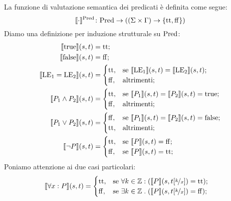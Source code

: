 \begin{definizione} 
La funzione di valutazione semantica dei predicati è definita come segue:
\[
   \mathord{\llbracket \cdot \rrbracket ^{\mathrm{Pred}}}\colon\mathrm{Pred}\to((\Sigma \times \Gamma) \rightarrow \{\mathrm{tt},\mathrm{ff}\})
\]
Diamo una definizione per induzione strutturale su $\mathrm{Pred}$:
\begin{align*}
   \llbracket \mathrm{true} \rrbracket(s,t)
      &= \mathrm{tt};\\
   \llbracket \mathrm{false} \rrbracket(s,t)
      &= \mathrm{ff};\\
   \llbracket \mathrm{LE}_1 = \mathrm{LE}_2\rrbracket(s,t)
      &=
        \begin{cases}
                \mathrm{tt}, &\text{se $\llbracket\mathrm{LE}_1\rrbracket(s,t) = \llbracket \mathrm{LE}_2 \rrbracket(s,t)$};\\
                \mathrm{ff}, &\text{altrimenti};
        \end{cases}\\
    \llbracket P_1 \land P_2\rrbracket(s,t)
      &=
        \begin{cases}
                \mathrm{tt}, &\text{se $\llbracket P_1\rrbracket(s,t) = \llbracket P_2\rrbracket(s,t) = \mathrm{true}$};\\
                \mathrm{ff}, &\text{altrimenti};
        \end{cases}\\
    \llbracket P_1 \lor P_2\rrbracket(s,t)
      &=
        \begin{cases}
                \mathrm{ff}, &\text{se $\llbracket P_1\rrbracket(s,t) = \llbracket P_2\rrbracket(s,t) = \mathrm{false}$};\\
                \mathrm{tt}, &\text{altrimenti};
        \end{cases} \\
    \llbracket \neg P\rrbracket(s,t)
       &=
        \begin{cases}
                \mathrm{tt},&\text{se $\llbracket P\rrbracket(s,t) = \mathrm{ff}$};\\
                \mathrm{ff},&\text{se $\llbracket P\rrbracket(s,t) = \mathrm{tt}$};
        \end{cases}
\end{align*}
Poniamo attenzione ai due casi particolari:
\begin{align*}
   \llbracket\forall x \mathrel{:} P\rrbracket(s,t)
      &=
        \begin{cases}
                \mathrm{tt}, &\text{se $\forall k\in\mathbb{Z}\mathrel{:}(\llbracket P\rrbracket(s,t[\nicefrac{k}{x}]) = \mathrm{tt}$});\\
                \mathrm{ff}, &\text{se $\exists k\in\mathbb{Z}\mathrel{.}(\llbracket P\rrbracket(s,t[\nicefrac{k}{x}]) = \mathrm{ff}$});

\end{cases}
\end{align*}
\end{definizione}

